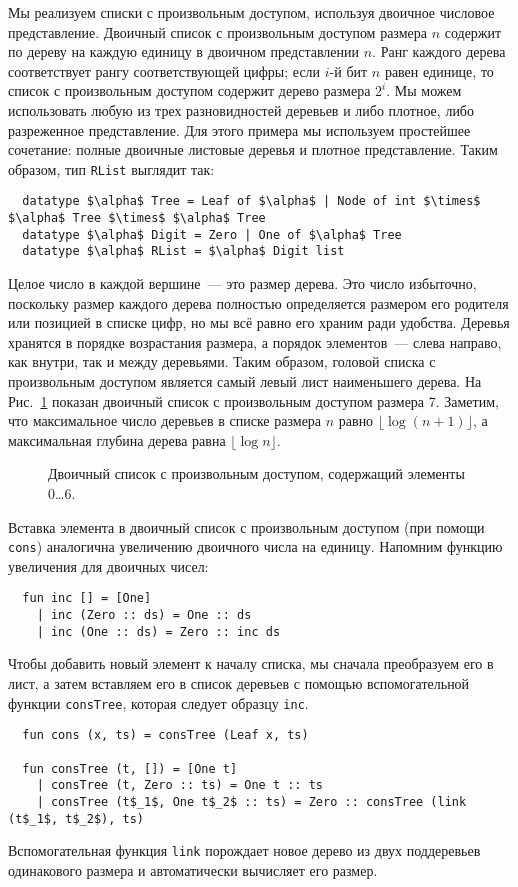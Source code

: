 Мы реализуем списки с произвольным доступом, используя двоичное
числовое представление. Двоичный список с произвольным доступом
размера $n$ содержит по дереву на каждую единицу в двоичном
представлении $n$. Ранг каждого дерева соответствует рангу
соответствующей цифры; если $i$-й бит $n$ равен единице, то список с
произвольным доступом содержит дерево размера $2^i$. Мы можем
использовать любую из трех разновидностей деревьев и либо плотное,
либо разреженное представление. Для этого примера мы используем
простейшее сочетание: полные двоичные листовые деревья и плотное
представление. Таким образом, тип \lstinline!RList! выглядит так:
\begin{lstlisting}
  datatype $\alpha$ Tree = Leaf of $\alpha$ | Node of int $\times$ $\alpha$ Tree $\times$ $\alpha$ Tree
  datatype $\alpha$ Digit = Zero | One of $\alpha$ Tree
  datatype $\alpha$ RList = $\alpha$ Digit list
\end{lstlisting}
Целое число в каждой вершине~--- это размер дерева. Это число
избыточно, поскольку размер каждого дерева полностью определяется
размером его родителя или позицией в списке цифр, но мы всё равно его
храним ради удобства. Деревья хранятся в порядке возрастания размера,
а порядок элементов~--- слева направо, как внутри, так и между
деревьями. Таким образом, головой списка с произвольным доступом
является самый левый лист наименьшего дерева. На Рис.~\ref{fig:9.5}
показан двоичный список с произвольным доступом размера 7. Заметим,
что максимальное число деревьев в списке размера $n$ равно 
$\lfloor \log (n+1) \rfloor$, а максимальная глубина дерева равна 
$\lfloor \log n \rfloor$.

\begin{figure}
  \centering
  
  \caption{Двоичный список с произвольным доступом, содержащий элементы 0\ldots 6.}
  \label{fig:9.5}
\end{figure}

Вставка элемента в двоичный список с произвольным доступом (при помощи
\lstinline!cons!) аналогична увеличению двоичного числа на
единицу. Напомним функцию увеличения для двоичных чисел:
\begin{lstlisting}
  fun inc [] = [One]
    | inc (Zero :: ds) = One :: ds
    | inc (One :: ds) = Zero :: inc ds
\end{lstlisting}
Чтобы добавить новый элемент к началу списка, мы сначала преобразуем
его в лист, а затем вставляем его в список деревьев с помощью
вспомогательной функции \lstinline!consTree!, которая следует образцу
\lstinline!inc!.
\begin{lstlisting}
  fun cons (x, ts) = consTree (Leaf x, ts)

  fun consTree (t, []) = [One t]
    | consTree (t, Zero :: ts) = One t :: ts
    | consTree (t$_1$, One t$_2$ :: ts) = Zero :: consTree (link (t$_1$, t$_2$), ts)
\end{lstlisting}
Вспомогательная функция \lstinline!link! порождает новое дерево из двух
поддеревьев одинакового размера и автоматически вычисляет его размер.

